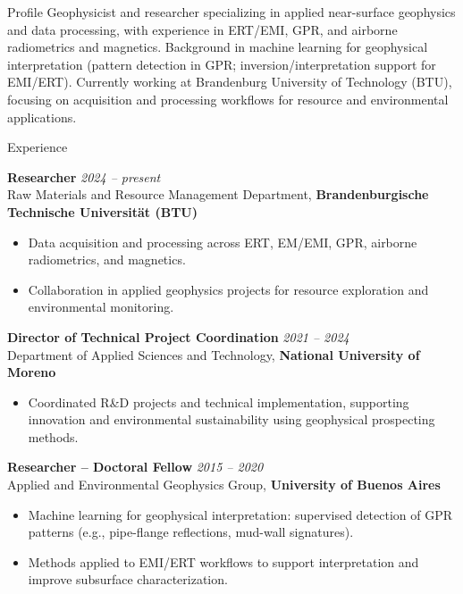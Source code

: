\documentclass{resume}
\begin{document}
\begin{rSection}{Profile}
Geophysicist and researcher specializing in applied near-surface geophysics and data processing, with experience in ERT/EMI, GPR, and airborne radiometrics and magnetics. Background in machine learning for geophysical interpretation (pattern detection in GPR; inversion/interpretation support for EMI/ERT). Currently working at Brandenburg University of Technology (BTU), focusing on acquisition and processing workflows for resource and environmental applications.
\end{rSection}

\begin{rSection}{Experience}

{\bf Researcher} \hfill {\em 2024 -- present}\\
Raw Materials and Resource Management Department, {\bf Brandenburgische Technische Universit{\"a}t (BTU)}
\begin{itemize}
  \item Data acquisition and processing across ERT, EM/EMI, GPR, airborne radiometrics, and magnetics.
  \item Collaboration in applied geophysics projects for resource exploration and environmental monitoring.
\end{itemize}

{\bf Director of Technical Project Coordination} \hfill {\em 2021 -- 2024}\\
Department of Applied Sciences and Technology, {\bf National University of Moreno}
\begin{itemize}
  \item Coordinated R\&D projects and technical implementation, supporting innovation and environmental sustainability using geophysical prospecting methods.
\end{itemize}

{\bf Researcher -- Doctoral Fellow} \hfill {\em 2015 -- 2020}\\
Applied and Environmental Geophysics Group, {\bf University of Buenos Aires}
\begin{itemize}
  \item Machine learning for geophysical interpretation: supervised detection of GPR patterns (e.g., pipe-flange reflections, mud-wall signatures).
  \item Methods applied to EMI/ERT workflows to support interpretation and improve subsurface characterization.
\end{itemize}

\end{rSection}
\end{document}
